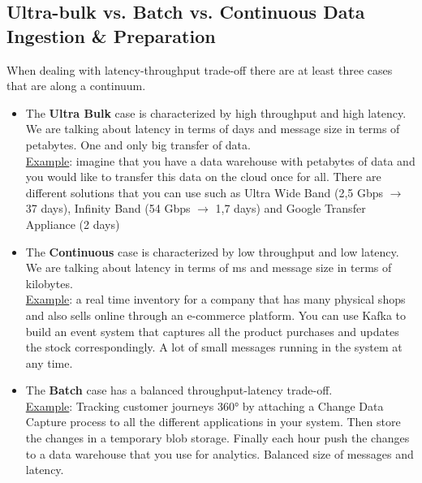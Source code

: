 \documentclass[10pt,a4paper]{article}
\begin{document}
\subsection{Ultra-bulk vs. Batch vs. Continuous Data Ingestion \& Preparation}
When dealing with latency-throughput trade-off there are at least three cases that are along a continuum.
\begin{itemize}
	\item The \textbf{Ultra Bulk} case is characterized by high throughput and high latency. We are talking about latency in terms of days and message size in terms of petabytes. One and only big transfer of data. \\
\uline{Example}:
imagine that you have a data warehouse with petabytes of data and you would like to transfer this data on the cloud once for all. There are different solutions that you can use such as Ultra Wide Band (2,5 Gbps $\rightarrow$ 37 days), Infinity Band (54 Gbps $\rightarrow$ 1,7 days) and Google Transfer Appliance (2 days)
	\item The \textbf{Continuous} case is characterized by low throughput and low latency. We are talking about latency in terms of ms and message size in terms of kilobytes. \\
\uline{Example}:
a real time inventory for a company that has many physical shops and also sells online through an e-commerce platform. You can use Kafka to build an event system that captures all the product purchases and updates the stock correspondingly. A lot of small messages running in the system at any time. 
	\item The \textbf{Batch} case has a balanced throughput-latency trade-off. \\
\uline{Example}:
Tracking customer journeys 360° by attaching a Change Data Capture process to all the different applications in your system. Then store the changes in a temporary blob storage. Finally each hour push the changes to a data warehouse that you use for analytics. Balanced size of messages and latency.
\end{itemize}
\end{document}
